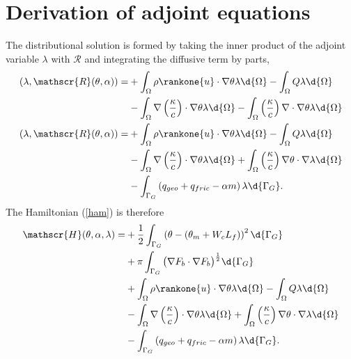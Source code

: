
\chapter{Derivation of adjoint equations}

The distributional solution is formed by taking the inner product of the adjoint variable $\lambda$ with $\mathscr{R}$ and integrating the diffusive term by parts,
\begin{align*}
  \left( \lambda, \mathscr{R}(\theta, \alpha) \right) = 
  &+ \int_{\Omega} \rho \rankone{u} \cdot \nabla \theta \lambda \d{\Omega} - \int_{\Omega} Q \lambda \d{\Omega} \\
  &- \int_{\Omega} \nabla \left( \frac{\kappa}{c} \right) \cdot \nabla \theta \lambda \d{\Omega} - \int_{\Omega} \left( \frac{\kappa}{c} \right) \nabla \cdot \nabla \theta \lambda \d{\Omega} \\
  \left( \lambda, \mathscr{R}(\theta, \alpha) \right) = 
  &+ \int_{\Omega} \rho \rankone{u} \cdot \nabla \theta \lambda \d{\Omega} - \int_{\Omega} Q \lambda \d{\Omega} \\
  &- \int_{\Omega} \nabla \left( \frac{\kappa}{c} \right) \cdot \nabla \theta \lambda \d{\Omega} + \int_{\Omega} \left( \frac{\kappa}{c} \right) \nabla \theta \cdot \nabla \lambda \d{\Omega} \\
  &- \int_{\Gamma_G} \left( q_{geo} + q_{fric} - \alpha m \right) \lambda \d{\Gamma_G}.
\end{align*}
The Hamiltonian (\ref{ham}) is therefore
\begin{align*}
  \mathscr{H}(\theta, \alpha, \lambda) =
  &+ \frac{1}{2} \int_{\Gamma_G} \left( \theta - \left(\theta_m + W_c L_f\right) \right)^2 \d{\Gamma_G} \\ 
  &+ \pi \int_{\Gamma_G} \big( \nabla F_b \cdot \nabla F_b \big)^{\frac{1}{2}} \d{\Gamma_G} \\
  &+ \int_{\Omega} \rho \rankone{u} \cdot \nabla \theta \lambda \d{\Omega} - \int_{\Omega} Q \lambda \d{\Omega} \\
  &- \int_{\Omega} \nabla \left( \frac{\kappa}{c} \right) \cdot \nabla \theta \lambda \d{\Omega} + \int_{\Omega} \left( \frac{\kappa}{c} \right) \nabla \theta \cdot \nabla \lambda \d{\Omega} \\
  &- \int_{\Gamma_G} \left( q_{geo} + q_{fric} - \alpha m \right) \lambda \d{\Gamma_G}.
\end{align*}

